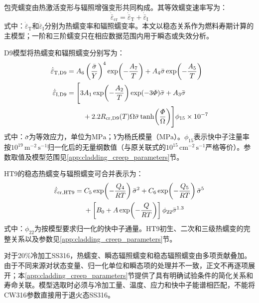 包壳蠕变由热激活变形与辐照增强变形共同构成。其等效蠕变速率写为：
\begin{equation}
	\dot{\bar\varepsilon}_{\mathrm{cr}}
	=\dot{\bar\varepsilon}_{\mathrm T}
	+\dot{\bar\varepsilon}_{\mathrm I}
	\label{eq:clad_total_creep_rate}
\end{equation}
\noindent 式中：$\dot{\bar\varepsilon}_{\mathrm T}$和$\dot{\bar\varepsilon}_{\mathrm I}$分别为热蠕变率和辐照蠕变率。本文以稳态关系作为燃料寿期计算的主模型；一阶和三阶蠕变只在相应数据范围内用于瞬态或失效分析。

D9模型将热蠕变和辐照蠕变分别写为\cite{hofmanMetallicFuelsHandbook2019,halesBISONTheoryManual2016}：
\begin{subequations}\label{eq:d9_creep_rate}
	\begin{align}
		\dot{\bar\varepsilon}_{\mathrm T,\mathrm{D9}}
		={}&A_6\left(\frac{\bar\sigma}{Y}\right)^4
		\exp\!\left(-\frac{A_7}{T}\right)
		+A_4\bar\sigma\exp\!\left(-\frac{A_5}{T}\right)
		\label{eq:d9_thermal_creep_rate}\\
		\dot{\bar\varepsilon}_{\mathrm I,\mathrm{D9}}
		={}&\Biggl[
		3A_1\exp\!\left(-\frac{A_2}{T}\right)
		\exp(-3\varPhi)\bar\sigma
		+A_3\bar\sigma
		\notag\\
		&\quad
		+2.2R_{\mathrm{cr,D9}}(T)\Omega\bar\sigma
		\tanh\!\left(\frac{\varPhi}{\Omega}\right)
		\Biggr]\phi_{15}\times10^{-7}
		\label{eq:d9_irradiation_creep_rate}
	\end{align}
\end{subequations}
\noindent 式中：$\bar\sigma$为等效应力，单位为$\mathrm{MPa}$；$Y$为杨氏模量（$\mathrm{MPa}$）。$\phi_{15}$表示快中子注量率按$10^{19}\,\mathrm{m^{-2}\,s^{-1}}$归一化后的无量纲数值（与原关联式的$10^{15}\,\mathrm{cm^{-2}\,s^{-1}}$严格等价）。参数取值及模型范围见\ref{app:cladding_creep_parameters}节。

HT9的稳态热蠕变与辐照蠕变可合并表示为\cite{hofmanMetallicFuelsHandbook2019,halesBISONTheoryManual2016}：
\begin{align}
	\dot{\bar\varepsilon}_{\mathrm{cr,HT9}}
	={}&C_5\exp\!\left(-\frac{Q_4}{RT}\right)\bar\sigma^2
	+C_6\exp\!\left(-\frac{Q_5}{RT}\right)\bar\sigma^5
	\notag\\
	&+\left[
	B_0+A\exp\!\left(-\frac{Q}{RT}\right)
	\right]\phi_{22}\bar\sigma^{1.3}
	\label{eq:ht9_steady_creep_rate}
\end{align}
\noindent 式中：$\phi_{22}$为按模型要求归一化的快中子通量。HT9初生、二次和三级热蠕变的完整关系以及参数见\ref{app:cladding_creep_parameters}节。

对于20\%冷加工SS316，热蠕变、瞬态辐照蠕变和稳态辐照蠕变由多项贡献叠加。由于不同来源对状态变量、归一化单位和瞬态项的处理并不一致，正文不再逐项展开；本\ref{app:cladding_creep_parameters}节提供了具有明确试验条件的简化关系和寿命关联。模型选取时必须与冷加工量、温度、应力和快中子能谱相匹配，不能将CW316参数直接用于退火态SS316。

